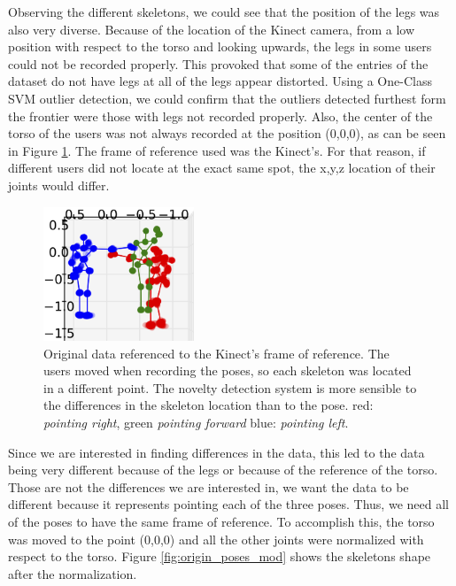 Observing the different skeletons, we could see that the position of the legs was also very diverse. Because of the location of the Kinect camera, from a low position with respect to the torso and looking upwards, the legs in some users could not be recorded properly. This provoked that some of the entries of the dataset do not have legs at all of the legs appear distorted. Using a One-Class SVM outlier detection, we could confirm that the outliers detected furthest form the frontier were those with legs not recorded properly. Also, the center of the torso of the users was not always recorded at the position (0,0,0), as can be seen in Figure \ref{fig:origin_poses}. The frame of reference used was the Kinect's. For that reason, if different users did not locate at the exact same spot, the x,y,z location of their joints would differ.

\begin{figure}[h]
\includegraphics[width=4.5cm]{Figures/origin_poses}
\centering
\caption[Original data referenced to the Kinect's frame of reference]{Original data referenced to the Kinect's frame of reference. The users moved when recording the poses, so each skeleton was located in a different point. The novelty detection system is more sensible to the differences in the skeleton location than to the pose. red: \emph{pointing right}, green \emph{pointing forward} blue: \emph{pointing left}. \label{fig:origin_poses}}
\end{figure}

Since we are interested in finding differences in the data, this led to the data being very different because of the legs or because of the reference of the torso. Those are not the differences we are interested in, we want the data to be different because it represents pointing each of the three poses. Thus, we need all of the poses to have the same frame of reference. To accomplish this, the torso was moved to the point (0,0,0) and  all the other joints were normalized with respect to the torso. Figure \ref{fig:origin_poses_mod} shows the skeletons shape after the normalization.

